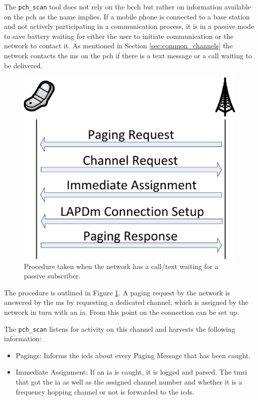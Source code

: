 The \texttt{pch\_scan} tool does not rely on the \gls{bcch} but rather on information available on the \gls{pch} as the name implies.
If a mobile phone is connected to a base station and not actively participating in a communication process, it is in a passive mode to save battery waiting for either the user to initiate communication or the network to contact it.
As mentioned in Section \ref{sec:common_channels} the network contacts the \gls{ms} on the \gls{pch} if there is a text message or a call waiting to be delivered.
\begin{figure}
\centering
\includegraphics{../Images/Paging}
\caption{Procedure taken when the network has a call/text waiting for a passive subscriber.}
\label{fig:paging}
\end{figure}
The procedure is outlined in Figure \ref{fig:paging}.
A paging request by the network is answered by the \gls{ms} by requesting a dedicated channel, which is assigned by the network in turn with an \gls{ia}.
From this point on the connection can be set up.

The \texttt{pch\_scan} listens for activity on this channel and harvests the following information:
\begin{itemize}
	\item Pagings: Informs the \gls{icds} about every Paging Message that has been caught.
	\item Immediate Assignment: If an \gls{ia} is caught, it is logged and parsed.
	The \gls{tmsi} that got the \gls{ia} as well as the assigned channel number and whether it is a frequency hopping channel or not is forwarded to the \gls{icds}.
\end{itemize}

